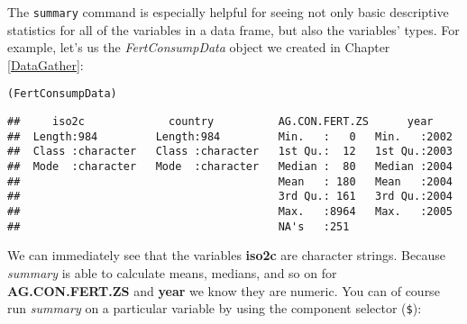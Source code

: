 The \texttt{summary} command is especially helpful for seeing not only basic descriptive statistics for all of the variables in a data frame, but also the variables' types. For example, let's us the \emph{FertConsumpData} object we created in Chapter \ref{DataGather}:

{\small
\begin{knitrout}
\color{fgcolor}\begin{kframe}
\begin{alltt}
(FertConsumpData)
\end{alltt}
\begin{verbatim}
##     iso2c             country          AG.CON.FERT.ZS      year     
##  Length:984         Length:984         Min.   :   0   Min.   :2002  
##  Class :character   Class :character   1st Qu.:  12   1st Qu.:2003  
##  Mode  :character   Mode  :character   Median :  80   Median :2004  
##                                        Mean   : 180   Mean   :2004  
##                                        3rd Qu.: 161   3rd Qu.:2004  
##                                        Max.   :8964   Max.   :2005  
##                                        NA's   :251
\end{verbatim}
\end{kframe}
\end{knitrout}

}

\noindent We can immediately see that the variables \textbf{iso2c} are character strings. Because \emph{summary} is able to calculate means, medians, and so on for \textbf{AG.CON.FERT.ZS} and \textbf{year} we know they are numeric. You can of course run \emph{summary} on a particular variable by using the component selector (\verb|$|):

\begin{knitrout}
\color{fgcolor}
\end{knitrout}


